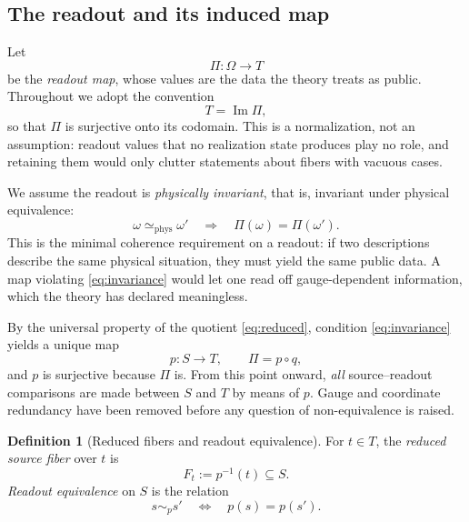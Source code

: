 \documentclass[11pt,reqno]{amsart}
\theoremstyle{plain}
\theoremstyle{definition}
\newtheorem{definition}[theorem]{Definition}
\theoremstyle{remark}
\DeclareMathOperator{\im}{Im}
\newcommand{\phe}{\simeq_{\mathrm{phys}}}
\newcommand{\Om}{\Omega}
\begin{document}
\subsection{The readout and its induced map}

Let
\begin{equation}
\label{eq:Pi}
\Pi\colon\Om\longrightarrow T
\end{equation}
be the \emph{readout map}, whose values are the data the theory treats as public. Throughout we adopt the convention
\begin{equation}
\label{eq:surjconv}
T=\im\Pi,
\end{equation}
so that $\Pi$ is surjective onto its codomain. This is a normalization, not an assumption: readout values that no realization state produces play no role, and retaining them would only clutter statements about fibers with vacuous cases.

We assume the readout is \emph{physically invariant}, that is, invariant under physical equivalence:
\begin{equation}
\label{eq:invariance}
\omega\phe\omega'
\quad\Longrightarrow\quad
\Pi(\omega)=\Pi(\omega').
\end{equation}
This is the minimal coherence requirement on a readout: if two descriptions describe the same physical situation, they must yield the same public data. A map violating \eqref{eq:invariance} would let one read off gauge-dependent information, which the theory has declared meaningless.

By the universal property of the quotient \eqref{eq:reduced}, condition \eqref{eq:invariance} yields a unique map
\begin{equation}
\label{eq:p}
p\colon S\longrightarrow T,
\qquad
\Pi=p\circ q,
\end{equation}
and $p$ is surjective because $\Pi$ is. From this point onward, \emph{all} source--readout comparisons are made between $S$ and $T$ by means of $p$. Gauge and coordinate redundancy have been removed before any question of non-equivalence is raised.

\begin{definition}[Reduced fibers and readout equivalence]
\label{def:fibers}
For $t\in T$, the \emph{reduced source fiber} over $t$ is
\begin{equation}
\label{eq:fiber}
F_{t}:=p^{-1}(t)\subseteq S .
\end{equation}
\emph{Readout equivalence} on $S$ is the relation
\begin{equation}
\label{eq:readouteq}
s\sim_{p}s'
\quad\Longleftrightarrow\quad
p(s)=p(s').
\end{equation}
\end{definition}
\end{document}
